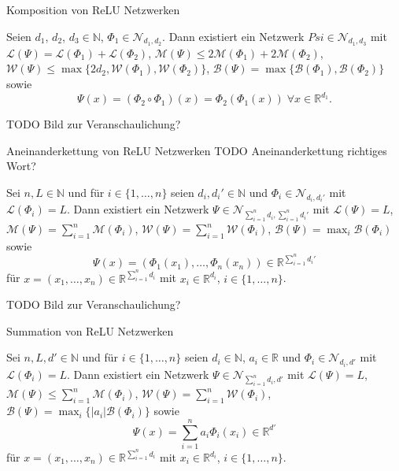 \documentclass[10pt,aspectratio=169]{beamer}
\newcommand{\N}{\mathbb{N}} %
\newcommand{\R}{\mathbb{R}} %
\newcommand{\set}[1]{\{#1\}}
\begin{document}
\begin{frame}{Komposition von ReLU Netzwerken}
    \begin{lemma}
        Seien \(d_1\), \(d_2\), \(d_3 \in \N\), \(\Phi_1 \in \mathcal{N}_{d_1, d_2}\). Dann existiert ein 
        Netzwerk \(Psi \in \mathcal{N}_{d_1, d_3}\) mit \(\mathcal{L}(\Psi) = \mathcal{L}(\Phi_1) + \mathcal{L}(\Phi_2)\), 
        \(\mathcal{M}(\Psi) \leq 2 \mathcal{M}(\Phi_1) + 2\mathcal{M}(\Phi_2)\), \(\mathcal{W}(\Psi) \leq 
        \max\set{2d_2, \mathcal{W}(\Phi_1), \mathcal{W}(\Phi_2)}\), \(\mathcal{B}(\Psi) = \max\set{\mathcal{B}(\Phi_1), \mathcal{B}(\Phi_2)}\) 
        sowie
        \[ \Psi(x) = (\Phi_2 \circ \Phi_1)(x) = \Phi_2(\Phi_1(x)) \;\forall x\in \R^{d_1}. \]
    \end{lemma}
    TODO Bild zur Veranschaulichung?
\end{frame}

\begin{frame}{Aneinanderkettung von ReLU Netzwerken}
    TODO Aneinanderkettung richtiges Wort?
    \begin{lemma}
        Sei \(n, L \in\N\) und für \(i\in \set{1,\ldots, n}\) seien \(d_i, d_i' \in \N\) und \(\Phi_i \in \mathcal{N}_{d_i, d_i'}\) 
        mit \(\mathcal{L}(\Phi_i) = L\). Dann existiert ein Netzwerk \(\Psi \in \mathcal{N}_{\sum_{i=1}^n d_i, \sum_{i=1}^n d_i'}\) 
        mit \(\mathcal{L}(\Psi) = L\), \(\mathcal{M}(\Psi) = \sum_{i=1}^n \mathcal{M}(\Phi_i)\), 
        \(\mathcal{W}(\Psi) = \sum_{i=1}^n \mathcal{W}(\Phi_i)\), \(\mathcal{B}(\Psi) = \max_i \mathcal{B}(\Phi_i)\) sowie 
        \[ \Psi(x) = (\Phi_1(x_1), \ldots, \Phi_n(x_n)) \in \R^{\sum_{i=1}^n d_i'} \]
        für \(x = (x_1, \ldots, x_n) \in \R^{\sum_{i=1}^n d_i}\) mit \(x_i \in \R^{d_i}\), \(i\in \set{1,\ldots, n}\).
    \end{lemma}
    TODO Bild zur Veranschaulichung?
\end{frame}

\begin{frame}{Summation von ReLU Netzwerken}
    \begin{lemma}
        Sei \(n, L, d' \in\N\) und für \(i\in \set{1,\ldots, n}\) seien \(d_i \in \N\), \(a_i \in \R\) und \(\Phi_i \in \mathcal{N}_{d_i, d'}\) 
        mit \(\mathcal{L}(\Phi_i) = L\). Dann existiert ein Netzwerk \(\Psi \in \mathcal{N}_{\sum_{i=1}^n d_i, d'}\) 
        mit \(\mathcal{L}(\Psi) = L\), \(\mathcal{M}(\Psi) \leq \sum_{i=1}^n \mathcal{M}(\Phi_i)\), 
        \(\mathcal{W}(\Psi) = \sum_{i=1}^n \mathcal{W}(\Phi_i)\), \(\mathcal{B}(\Psi) = \max_i \set{|a_i| \mathcal{B}(\Phi_i)}\) sowie 
        \[ \Psi(x) = \sum_{i=1}^n a_i \Phi_i(x_i) \in \R^{d'} \]
        für \(x = (x_1, \ldots, x_n) \in \R^{\sum_{i=1}^n d_i}\) mit \(x_i \in \R^{d_i}\), \(i\in \set{1,\ldots, n}\).
    \end{lemma}
\end{frame}
\end{document}

